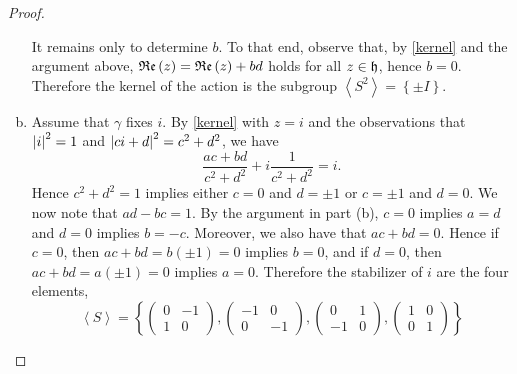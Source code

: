\documentclass[10pt]{amsart}
\begin{document}
\begin{thm}
\begin{proof}
\begin{enumerate}[(a)]
			It remains only to determine $b$.  
			To that end, observe that, by \eqref{kernel} and the argument above, $\operatorname{\mathfrak{Re}}\left(z\right) = \operatorname{\mathfrak{Re}}\left(z\right) + bd$ holds for all $z \in \mathfrak{h}$, hence $b = 0$.
			Therefore the kernel of the action is the subgroup $\left<S^2\right> = \left\{\pm I \right\}$.
		\item
			Assume that $\gamma$ fixes $i$.
			By \eqref{kernel} with $z = i$ and the observations that $\left| i \right|^2 = 1$ and $\left| ci + d \right|^2 = c^2 + d^2$, we have 
				$$\frac{ac + bd}{c^2+d^2} + i\frac{1}{c^2+d^2} = i.$$
			Hence $c^2 + d^2 = 1$ implies either $c = 0$ and $d = \pm 1$ or $c = \pm 1$ and $d = 0$.
			We now note that $ad - bc = 1$.
			By the argument in part (b), $c = 0$ implies $a = d$ and $d = 0$ implies $b = -c$.
			Moreover, we also have that $ac + bd = 0$.
			Hence if $c = 0$, then $ac + bd = b(\pm 1) = 0$ implies $b = 0$, and if $d = 0$, then $ac + bd = a(\pm1) = 0$ implies $a = 0$.
			Therefore the stabilizer of $i$ are the four elements, $$\left<S\right> = \left\{
			\left(\begin{array}{cc} 0 & -1\\1 & 0\end{array}\right), 
			\left(\begin{array}{cc} -1 & 0\\0 & -1\end{array}\right),
			\left(\begin{array}{cc} 0 & 1\\-1 & 0\end{array}\right),
			\left(\begin{array}{cc} 1 & 0\\0 & 1\end{array}\right)\right\}$$
			
	\end{enumerate}
  \end{proof}
\end{thm}
\end{document}
